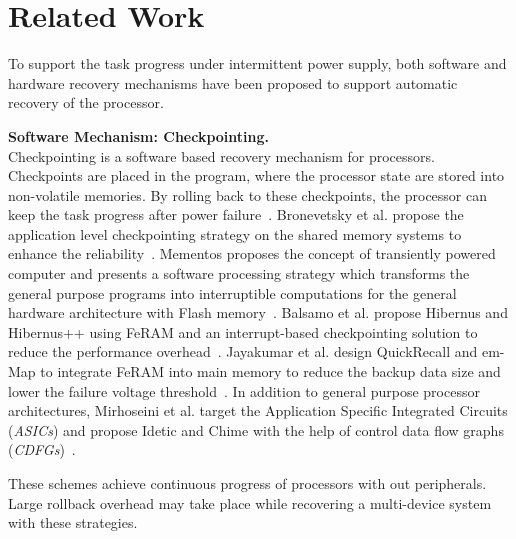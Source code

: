 \section{Related Work} \label{sec:related}
%
To support the task progress under intermittent power supply, both software and hardware recovery mechanisms have been proposed to support automatic recovery of the processor.

\noindent\textbf{Software Mechanism: Checkpointing.} \\
%
Checkpointing is a software based recovery mechanism for processors.
Checkpoints are placed in the program, where the processor state are stored into non-volatile memories.
By rolling back to these checkpoints, the processor can keep the task progress after power failure~\cite{Dong2011Hybrid, Ma2015Architecture}.
Bronevetsky et al. propose the application level checkpointing strategy on the shared memory systems to enhance the reliability~\cite{Bronevetsky2004Application}.
Mementos proposes the concept of transiently powered computer and presents a software processing strategy which transforms the general purpose programs into interruptible computations for the general hardware architecture with Flash memory~\cite{ransford2012mementos}.
Balsamo et al. propose Hibernus and Hibernus++ using FeRAM and an interrupt-based checkpointing solution to reduce the performance overhead~\cite{balsamo2015hibernus,Balsamo2016Hibernus++,Rodriguez2015Approaches}.
Jayakumar et al. design QuickRecall and em-Map to integrate FeRAM into main memory to reduce the backup data size and lower the failure voltage threshold~\cite{jayakumar2014quickrecall,jayakumar2015q}.
In addition to general purpose processor architectures, Mirhoseini et al. target the Application Specific Integrated Circuits (\emph{ASICs}) and propose Idetic and Chime with the help of control data flow graphs (\emph{CDFGs})~\cite{Mirhoseini2013Idetic,Mirhoseini2013Automated,Mirhoseini2016Chime}.

These schemes achieve continuous progress of processors with out peripherals.
Large rollback overhead may take place while recovering a multi-device system with these strategies. 

